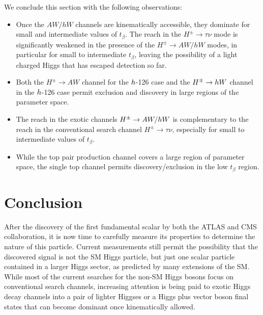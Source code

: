  We conclude this section with the following observations: 
\begin{itemize}
\item Once the $AW/hW$ channels are kinematically accessible, they dominate for small and intermediate values of $t_{\beta}$. The reach in the $H^{\pm} \rightarrow \tau\nu$ mode is significantly weakened in the presence of the $H^{\pm} \rightarrow AW/hW$ modes, in particular for small to intermediate $t_{\beta}$, leaving the possibility of a light charged Higgs that has escaped detection so far.
\item Both the $H^{\pm} \rightarrow A W$ channel for the $h$-126 case and the $H^{\pm} \rightarrow h W$ channel in the $h$-126 case permit exclusion and discovery in large regions of the parameter space.
\item The reach in the exotic channels $H^{\pm} \rightarrow A W/h W$ is complementary to the reach in the conventional search channel $H^{\pm} \rightarrow \tau\nu$, especially for small to intermediate values of $t_{\beta}$. 
\item While the top pair production channel covers a large region of parameter space, the single top channel permits discovery/exclusion in the low $t_{\beta}$ region.  
\end{itemize} 

\section{Conclusion}
\label{sec:light_charged_conclusion}

After the discovery of the first fundamental scalar by both the ATLAS and CMS collaboration, it is now time to carefully measure its properties to determine the nature of this particle. Current measurements still permit the possibility that the discovered signal is not the SM Higgs particle, but just one scalar particle contained in a larger Higgs sector, as predicted by many extensions of the SM. While most of the current searches for the non-SM Higgs bosons focus on conventional search channels, increasing attention is being paid to exotic Higgs decay channels \cite{Curtin:2013fra, Brownson:2013lka, Coleppa:2014hxa, Coleppa:2014cca,Li:2015lra,Dorsch:2014qja,Chen:2013emb,Chen:2014dma,Enberg:2014pua,CMS:2014yra,Aad:2015wra,CMS:2013eua} into a pair of lighter Higgses or a Higgs plus vector boson final states that can become dominant once kinematically allowed. 

